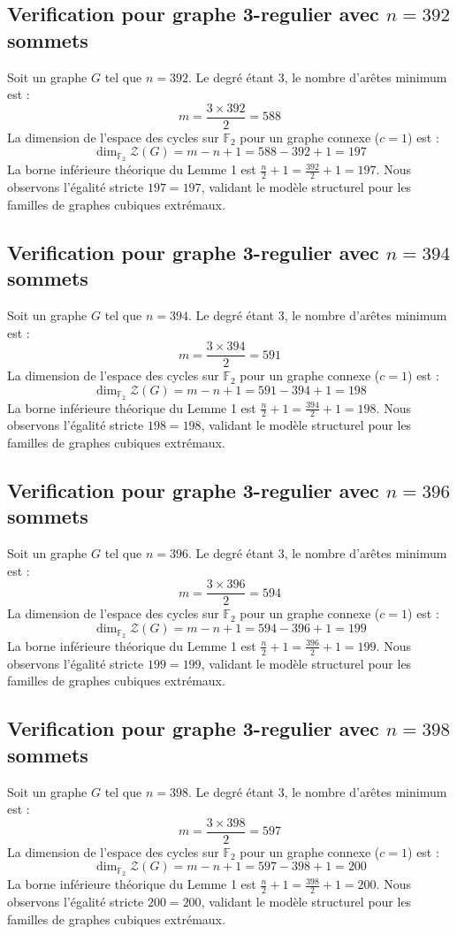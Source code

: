 \documentclass[11pt,a4paper]{article}
\begin{document}
\subsection{Verification pour graphe 3-regulier avec $n=392$ sommets}
Soit un graphe $G$ tel que $n = 392$. Le degré étant 3, le nombre d'arêtes minimum est :
$$ m = \frac{3 \times 392}{2} = 588 $$
La dimension de l'espace des cycles sur $\mathbb{F}_2$ pour un graphe connexe ($c=1$) est :
$$ \dim_{\mathbb{F}_2} \mathcal{Z}(G) = m - n + 1 = 588 - 392 + 1 = 197 $$
La borne inférieure théorique du Lemme 1 est $\frac{n}{2} + 1 = \frac{392}{2} + 1 = 197$.
Nous observons l'égalité stricte $197 = 197$, validant le modèle structurel pour les familles de graphes cubiques extrémaux.

\subsection{Verification pour graphe 3-regulier avec $n=394$ sommets}
Soit un graphe $G$ tel que $n = 394$. Le degré étant 3, le nombre d'arêtes minimum est :
$$ m = \frac{3 \times 394}{2} = 591 $$
La dimension de l'espace des cycles sur $\mathbb{F}_2$ pour un graphe connexe ($c=1$) est :
$$ \dim_{\mathbb{F}_2} \mathcal{Z}(G) = m - n + 1 = 591 - 394 + 1 = 198 $$
La borne inférieure théorique du Lemme 1 est $\frac{n}{2} + 1 = \frac{394}{2} + 1 = 198$.
Nous observons l'égalité stricte $198 = 198$, validant le modèle structurel pour les familles de graphes cubiques extrémaux.

\subsection{Verification pour graphe 3-regulier avec $n=396$ sommets}
Soit un graphe $G$ tel que $n = 396$. Le degré étant 3, le nombre d'arêtes minimum est :
$$ m = \frac{3 \times 396}{2} = 594 $$
La dimension de l'espace des cycles sur $\mathbb{F}_2$ pour un graphe connexe ($c=1$) est :
$$ \dim_{\mathbb{F}_2} \mathcal{Z}(G) = m - n + 1 = 594 - 396 + 1 = 199 $$
La borne inférieure théorique du Lemme 1 est $\frac{n}{2} + 1 = \frac{396}{2} + 1 = 199$.
Nous observons l'égalité stricte $199 = 199$, validant le modèle structurel pour les familles de graphes cubiques extrémaux.

\subsection{Verification pour graphe 3-regulier avec $n=398$ sommets}
Soit un graphe $G$ tel que $n = 398$. Le degré étant 3, le nombre d'arêtes minimum est :
$$ m = \frac{3 \times 398}{2} = 597 $$
La dimension de l'espace des cycles sur $\mathbb{F}_2$ pour un graphe connexe ($c=1$) est :
$$ \dim_{\mathbb{F}_2} \mathcal{Z}(G) = m - n + 1 = 597 - 398 + 1 = 200 $$
La borne inférieure théorique du Lemme 1 est $\frac{n}{2} + 1 = \frac{398}{2} + 1 = 200$.
Nous observons l'égalité stricte $200 = 200$, validant le modèle structurel pour les familles de graphes cubiques extrémaux.
\end{document}
